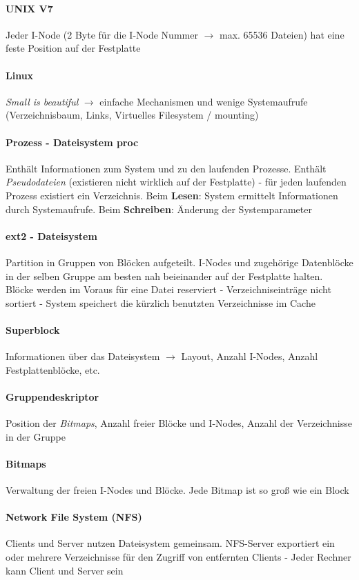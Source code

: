 \documentclass[11pt,a4paper,landscape]{article}
\begin{document}
\begin{multicols*}{3}
	\paragraph{UNIX V7} Jeder I-Node (2 Byte für die I-Node Nummer $\rightarrow$ max. 65536 Dateien) hat eine feste Position auf der Festplatte
	\paragraph{Linux} \textit{Small is beautiful} $\rightarrow$ einfache Mechanismen und wenige Systemaufrufe (Verzeichnisbaum, Links, Virtuelles Filesystem / mounting)
	\paragraph{Prozess - Dateisystem proc} Enthält Informationen zum System und zu den laufenden Prozesse. Enthält \textit{Pseudodateien} (existieren nicht wirklich auf der Festplatte) - für jeden laufenden Prozess existiert ein Verzeichnis. Beim \textbf{Lesen}: System ermittelt Informationen durch Systemaufrufe. Beim \textbf{Schreiben}: Änderung der Systemparameter
	\paragraph{ext2 - Dateisystem} Partition in Gruppen von Blöcken aufgeteilt. I-Nodes und zugehörige Datenblöcke in der selben Gruppe am besten nah beieinander auf der Festplatte halten. Blöcke werden im Voraus für eine Datei reserviert - Verzeichniseinträge nicht sortiert - System speichert die kürzlich benutzten Verzeichnisse im Cache
	\paragraph{Superblock} Informationen über das Dateisystem $\rightarrow$ Layout, Anzahl I-Nodes, Anzahl Festplattenblöcke, etc.
	\paragraph{Gruppendeskriptor} Position der \textit{Bitmaps}, Anzahl freier Blöcke und I-Nodes, Anzahl der Verzeichnisse in der Gruppe
	\paragraph{Bitmaps} Verwaltung der freien I-Nodes und Blöcke. Jede Bitmap ist so groß wie ein Block
	\paragraph{Network File System (NFS)} Clients und Server nutzen Dateisystem gemeinsam. NFS-Server exportiert ein oder mehrere Verzeichnisse für den Zugriff von entfernten Clients - Jeder Rechner kann Client und Server sein

\end{multicols*}
\end{document}
